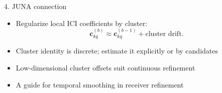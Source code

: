 \documentclass[aspectratio=169,10pt]{beamer}
\begin{document}
\begin{frame}{4. JUNA connection}
\begin{itemize}\setlength{\itemsep}{0.5em}
  \item Regularize local ICI coefficients by cluster:
  \[
    \bm c_{kq}^{(b)}
    \approx
    \bm c_{kq}^{(b-1)}+\text{cluster drift}.
  \]
  \item Cluster identity is discrete; estimate it explicitly or by candidates
  \item Low-dimensional cluster offsets suit continuous refinement
  \item A guide for temporal smoothing in receiver refinement
\end{itemize}
\end{frame}
\end{document}
